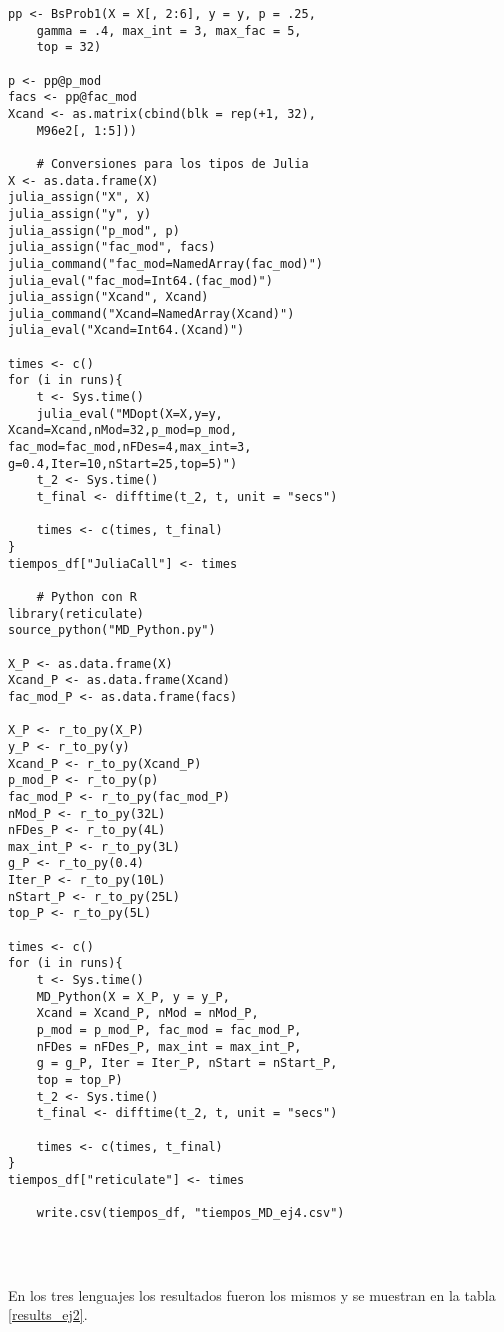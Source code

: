 \begin{verbatim}
pp <- BsProb1(X = X[, 2:6], y = y, p = .25, 
	gamma = .4, max_int = 3, max_fac = 5, 
	top = 32)
	
p <- pp@p_mod
facs <- pp@fac_mod
Xcand <- as.matrix(cbind(blk = rep(+1, 32), 
	M96e2[, 1:5]))
	
	# Conversiones para los tipos de Julia
X <- as.data.frame(X)
julia_assign("X", X)
julia_assign("y", y)
julia_assign("p_mod", p)
julia_assign("fac_mod", facs)
julia_command("fac_mod=NamedArray(fac_mod)")
julia_eval("fac_mod=Int64.(fac_mod)")
julia_assign("Xcand", Xcand)
julia_command("Xcand=NamedArray(Xcand)")
julia_eval("Xcand=Int64.(Xcand)")
	
times <- c()
for (i in runs){
	t <- Sys.time()
	julia_eval("MDopt(X=X,y=y, 
Xcand=Xcand,nMod=32,p_mod=p_mod, 
fac_mod=fac_mod,nFDes=4,max_int=3, 
g=0.4,Iter=10,nStart=25,top=5)")
	t_2 <- Sys.time()
	t_final <- difftime(t_2, t, unit = "secs")
	
	times <- c(times, t_final)
}
tiempos_df["JuliaCall"] <- times
	
	# Python con R
library(reticulate)
source_python("MD_Python.py")
	
X_P <- as.data.frame(X)
Xcand_P <- as.data.frame(Xcand)
fac_mod_P <- as.data.frame(facs)
	
X_P <- r_to_py(X_P)
y_P <- r_to_py(y) 
Xcand_P <- r_to_py(Xcand_P)
p_mod_P <- r_to_py(p)
fac_mod_P <- r_to_py(fac_mod_P)
nMod_P <- r_to_py(32L)
nFDes_P <- r_to_py(4L)
max_int_P <- r_to_py(3L)
g_P <- r_to_py(0.4)
Iter_P <- r_to_py(10L)
nStart_P <- r_to_py(25L)
top_P <- r_to_py(5L)
	
times <- c()
for (i in runs){
	t <- Sys.time()
	MD_Python(X = X_P, y = y_P, 
	Xcand = Xcand_P, nMod = nMod_P, 
	p_mod = p_mod_P, fac_mod = fac_mod_P, 
	nFDes = nFDes_P, max_int = max_int_P, 
	g = g_P, Iter = Iter_P, nStart = nStart_P, 
	top = top_P)
	t_2 <- Sys.time()
	t_final <- difftime(t_2, t, unit = "secs")

	times <- c(times, t_final)
}
tiempos_df["reticulate"] <- times
	
	write.csv(tiempos_df, "tiempos_MD_ej4.csv")
	
	
	
\end{verbatim} 

En los tres lenguajes los resultados fueron los mismos y se muestran en la tabla \ref{results_ej2}.

